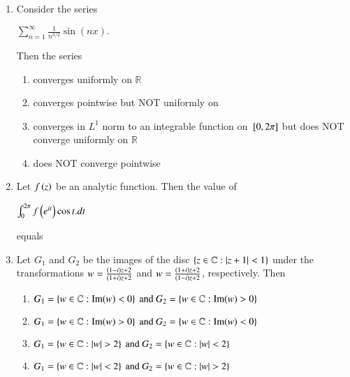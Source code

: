 \documentclass[journal]{IEEEtran}
\begin{document}
\begin{enumerate}
\begin{enumerate}
\end{enumerate}
\item  Consider the series \begin{center} $\sum_{n=1}^{\infty} \frac{1}{n^{3/2}} \sin(nx).$ \end{center}  Then the series 
\begin{enumerate}
\item converges uniformly on  $\mathbb{R} $
\item converges pointwise but NOT uniformly on %
\item converges in  $L^1$ norm to an integrable function on  ${}\left[0,2\pi\right]$ but does NOT converge uniformly on  $\mathbb{R}$ 
\item does NOT converge pointwise
\end{enumerate}
\item Let  $f\left(z\right)$ be an analytic function. Then the value of \begin{center} $\int_0^{2\pi} f\left(e^{it}\right) \cos t .dt $ \end{center} equals
\begin{enumerate}
\end{enumerate}
\newpage
\item Let $G_1$ and $G_2$ be the images of the disc  $\left\{z \in \mathbb{C} : \left\vert z+1\right\vert < 1\right\}$ under the transformations $w = \frac{\left(1-i\right)z+2}{\left(1+i\right)z+2}$  and $ w = \frac{\left(1+i\right)z+2}{\left(1-i\right)z+2}$, respectively. Then \\
\begin{enumerate}
\item $ G_1 = \left\{w \in \mathbb{C}: \text{Im}(w) < 0\right\} \text{ and } G_2 = \left\{w \in \mathbb{C}: \text{Im}(w) > 0\right\} $
\item $ G_1 = \left\{w \in \mathbb{C}: \text{Im}(w) > 0\right\} \text{ and } G_2 = \left\{w \in \mathbb{C}: \text{Im}(w) < 0\right\} $
\item $ G_1 = \left\{w \in \mathbb{C}: |w| > 2\right\} \text{ and } G_2 = \left\{w \in \mathbb{C}: |w| < 2\right\}  $
\item $ G_1 = \left\{w \in \mathbb{C}: |w| < 2\right\} \text{ and } G_2 = \left\{w \in \mathbb{C}: |w| > 2\right\} $
\end{enumerate}
\end{enumerate}
\end{document}
